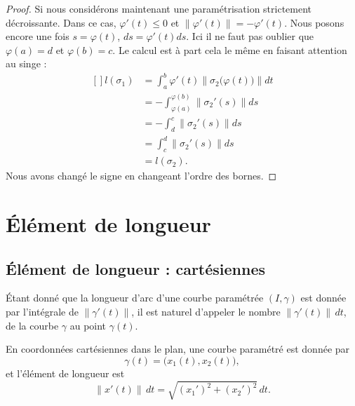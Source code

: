 \begin{proof}
    Si nous considérons maintenant une paramétrisation strictement décroissante. Dans ce cas, $\varphi'(t)\leq 0$ et $\| \varphi'(t) \|=-\varphi'(t)$. Nous posons encore une fois $s=\varphi(t)$, $ds=\varphi'(t)ds$. Ici il ne faut pas oublier que $\varphi(a)=d$ et $\varphi(b)=c$. Le calcul est à part cela le même en faisant attention au singe :
    \begin{equation}
        \begin{aligned}[]
            l(\sigma_1)&=\int_a^b\varphi'(t)\| \sigma_2\big( \varphi(t) \big) \|dt\\
            &=-\int_{\varphi(a)}^{\varphi(b)}\| \sigma_2'(s) \|ds\\
            &=-\int_d^c\| \sigma_2'(s) \|ds\\
            &=\int_c^d\| \sigma_2'(s) \|ds\\
            &=l(\sigma_2).
        \end{aligned}
    \end{equation}
    Nous avons changé le signe en changeant l'ordre des bornes.
\end{proof}


\section{Élément de longueur}

\subsection{Élément de longueur : cartésiennes}

Étant donné que la longueur d'arc d'une courbe paramétrée $(I,\gamma)$ est donnée par l'intégrale de $\| \gamma'(t) \|$, il est naturel d'appeler le nombre $\| \gamma'(t) \|\,dt$,  de la courbe $\gamma$ au point $\gamma(t)$.

En coordonnées cartésiennes dans le plan, une courbe paramétré est donnée par 
\begin{equation}
    \gamma(t)=\big( x_1(t),x_2(t) \big),
\end{equation}
et l'élément de longueur est
\begin{equation}        \label{EqElLongCart}
    \| x'(t) \|\, dt =\sqrt{(x_1')^2+(x_2')^2} \, dt.
\end{equation}

